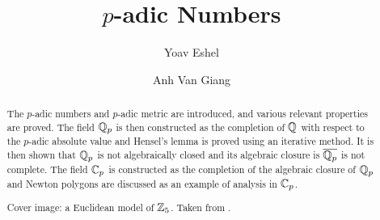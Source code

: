 \documentclass[12pt,vu]{adammath}
\begin{document}
\title{$p$-adic Numbers}
\author[y.eshel@student.vu.nl, 2660535]{Yoav Eshel}
\author[vangianganh@gmail.com, 2658762]{Anh Van Giang}
\maketitle

\frontmatter
\begin{abstract}
    The $p$-adic numbers and $p$-adic metric are introduced, and various relevant properties are proved. 
    The field $\mathbb{Q}_p$ is then constructed as the completion of $\mathbb{Q}$ with respect to the $p$-adic absolute value and Hensel's lemma is proved using an iterative method.
    It is then shown that $\mathbb{Q}_p$ is not algebraically closed and its algebraic closure is $\overline{\mathbb{Q}_p}$ is not complete.
    The field $\mathbb{C}_p$ is constructed as the completion of the algebraic closure of $\mathbb{Q}_p$ and Newton polygons are discussed as an example of analysis in $\mathbb{C}_p$.

    Cover image: a Euclidean model of $\mathbb{Z}_5$. Taken from \cite{Gouvea_2013}.
\end{abstract}

\begingroup
\tableofcontents
\endgroup
\printnomenclature

\mainmatter




%







% 
\end{document}
